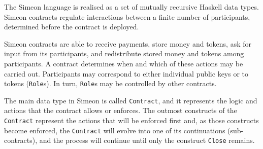 \documentclass[english,runningheads]{llncs}
\begin{document}
The Simeon language is realised as a set of mutually recursive Haskell
data types. Simeon contracts regulate interactions between a finite number
of participants, determined before the contract is deployed.

Simeon contracts are able to receive payments, store money and tokens,
ask for input from its participants, and redistribute stored money
and tokens among participants. A contract determines when and which of
these actions may be carried out. Participants may correspond to either
individual public keys or to tokens (\texttt{Role}s). In turn, \texttt{Role}s
may be controlled by other contracts.

The main data type in Simeon is called \texttt{Contract}, and it represents
the logic and actions that the contract allows or enforces. The outmost
constructs of the \texttt{Contract} represent the actions that will be enforced
first and, as those constructs become enforced, the \texttt{Contract} will
evolve into one of its continuations (sub-contracts), and the process
will continue until only the construct \texttt{Close} remains.
\end{document}
